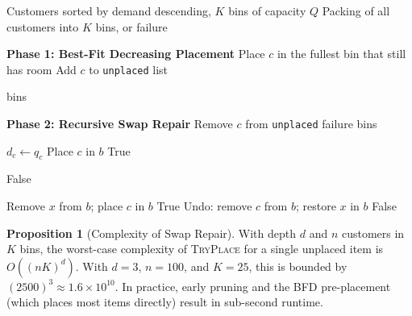 \documentclass[12pt,a4paper]{article}
\theoremstyle{definition}
\newtheorem{proposition}{Proposition}[section]
\begin{document}
\begin{algorithm}[H]
\caption{BFD + Recursive Swap Repair}
\begin{algorithmic}[1]
\Require Customers sorted by demand descending, $K$ bins of capacity $Q$
\Ensure Packing of all customers into $K$ bins, or failure

\State \textbf{Phase 1: Best-Fit Decreasing Placement}
    \State Place $c$ in the fullest bin that still has room
        \State Add $c$ to \texttt{unplaced} list
    \EndIf
\EndFor

    \State \Return bins
\EndIf

\State \textbf{Phase 2: Recursive Swap Repair}
        \State Remove $c$ from \texttt{unplaced}
    \Else
        \State \Return failure
    \EndIf
\EndFor
\State \Return bins
\end{algorithmic}
\end{algorithm}

\begin{algorithm}[H]
\caption{TryPlace --- Recursive Swap}
\begin{algorithmic}[1]
    \State $d_c \gets q_c$ 
            \State Place $c$ in $b$
            \State \Return True 
        \EndIf
    \EndFor
    
        \State \Return False
    \EndIf
    
                \State Remove $x$ from $b$; place $c$ in $b$
                    \State \Return True
                \EndIf
                \State Undo: remove $c$ from $b$; restore $x$ in $b$
            \EndIf
        \EndFor
    \EndFor
    \State \Return False
\EndFunction
\end{algorithmic}
\end{algorithm}

\begin{proposition}[Complexity of Swap Repair]
With depth $d$ and $n$ customers in $K$ bins, the worst-case complexity of \textsc{TryPlace} for a single unplaced item is $O((nK)^d)$. With $d = 3$, $n = 100$, and $K = 25$, this is bounded by $(2500)^3 \approx 1.6 \times 10^{10}$. In practice, early pruning and the BFD pre-placement (which places most items directly) result in sub-second runtime.
\end{proposition}
\end{document}
